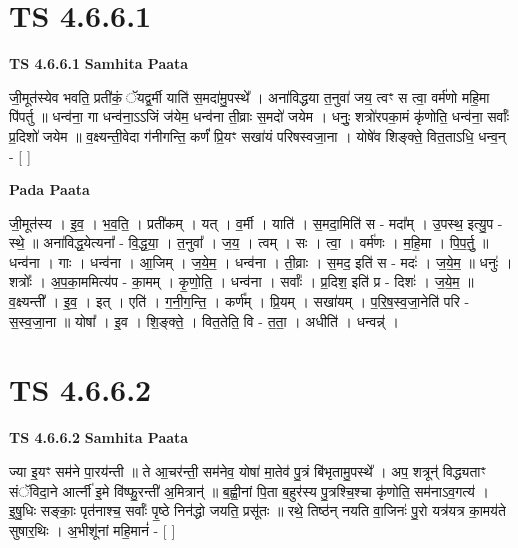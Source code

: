 \documentclass[17pt]{extarticle}
\begin{document}
\section*{ TS 4.6.6.1 }

\textbf{TS 4.6.6.1 } \newline
\textbf{Samhita Paata} \newline

जी॒मूत॑स्येव भवति॒ प्रती॑कं॒ ॅयद्व॒र्मी याति॑ स॒मदा॑मु॒पस्थे᳚ । अना॑विद्धया त॒नुवा॑ जय॒ त्वꣳ स त्वा॒ वर्म॑णो महि॒मा पि॑पर्तु ॥ धन्व॑ना॒ गा धन्व॑ना॒ऽऽजिं ज॑येम॒ धन्व॑ना ती॒व्राः स॒मदो॑ जयेम । धनुः॒ शत्रो॑रपका॒मं कृ॑णोति॒ धन्व॑ना॒ सर्वाः᳚ प्र॒दिशो॑ जयेम ॥ व॒क्ष्यन्ती॒वेदा ग॑नीगन्ति॒ कर्णं॑ प्रि॒यꣳ सखा॑यं परिषस्वजा॒ना । योषे॑व शिङ्क्ते॒ वित॒ताऽधि॒ धन्व॒न् - [  ] \newline

\textbf{Pada Paata} \newline

जी॒मूत॑स्य । इ॒व॒ । भ॒व॒ति॒ । प्रती॑कम् । यत् । व॒र्मी । याति॑ । स॒मदा॒मिति॑ स - मदा᳚म् । उ॒पस्थ॒ इत्यु॒प - स्थे॒ ॥ अना॑विद्ध॒येत्यना᳚ - वि॒द्ध॒या॒ । त॒नुवा᳚ । ज॒य॒ । त्वम् । सः । त्वा॒ । वर्म॑णः । म॒हि॒मा । पि॒प॒र्तु॒ ॥ धन्व॑ना । गाः । धन्व॑ना । आ॒जिम् । ज॒ये॒म॒ । धन्व॑ना । ती॒व्राः । स॒मद॒ इति॑ स - मदः॑ । ज॒ये॒म॒ ॥ धनुः॑ । शत्रोः᳚ । अ॒प॒का॒ममित्य॑प - का॒मम् । कृ॒णो॒ति॒ । धन्व॑ना । सर्वाः᳚ । प्र॒दिश॒ इति॑ प्र - दिशः॑ । ज॒ये॒म॒ ॥ व॒क्ष्यन्ती᳚ । इ॒व॒ । इत् । एति॑ । ग॒नी॒ग॒न्ति॒ । कर्ण᳚म् । प्रि॒यम् । सखा॑यम् । प॒रि॒ष॒स्व॒जा॒नेति॑ परि - स॒स्व॒जा॒ना ॥ योषा᳚ । इ॒व । शि॒ङ्क्ते॒ । वित॒तेति॒ वि - त॒ता॒ । अधीति॑ । धन्वन्न्॑ ।  \newline




\section*{ TS 4.6.6.2 }

\textbf{TS 4.6.6.2 } \newline
\textbf{Samhita Paata} \newline

ज्या इ॒यꣳ सम॑ने पा॒रय॑न्ती ॥ ते आ॒चर॑न्ती॒ सम॑नेव॒ योषा॑ मा॒तेव॑ पु॒त्रं बि॑भृतामु॒पस्थे᳚ । अप॒ शत्रून्॑ विद्ध्यताꣳ संॅविदा॒ने आर्त्नी॑ इ॒मे वि॑ष्फु॒रन्ती॑ अ॒मित्रान्॑ ॥ ब॒ह्वी॒नां पि॒ता ब॒हुर॑स्य पु॒त्रश्चि॒श्चा कृ॑णोति॒ सम॑नाऽव॒गत्य॑ । इ॒षु॒धिः सङ्काः॒ पृत॑नाश्च॒ सर्वाः᳚ पृ॒ष्ठे निन॑द्धो जयति॒ प्रसू॑तः ॥ रथे॒ तिष्ठ॑न् नयति वा॒जिनः॑ पु॒रो यत्र॑यत्र का॒मय॑ते सुषार॒थिः । अ॒भीशू॑नां महि॒मानं॑ - [  ] \newline
\end{document}
